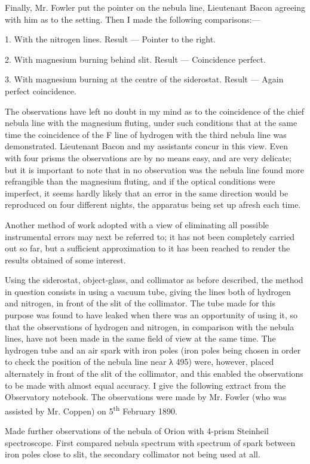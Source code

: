 \documentclass[a4paper, 12pt, oneside, polutonikogreek, english]{article}
\begin{document}
Finally, Mr. Fowler put the pointer on the nebula line, Lieutenant Bacon agreeing with him as to the setting. Then I made the following comparisons:---

1. With the nitrogen lines. Result --- Pointer to the right.

2. With magnesium burning behind slit. Result --- Coincidence perfect.

3. With magnesium burning at the centre of the siderostat. Result --- Again perfect coincidence.

The observations have left no doubt in my mind as to the coincidence of the chief nebula line with the magnesium fluting, under such conditions that at the same time the coincidence of the F line of hydrogen with the third nebula line was demonstrated. Lieutenant Bacon and my assistants concur in this view. Even with four prisms the observations are by no means easy, and are very delicate; but it is important to note that in no observation was the nebula line found more refrangible than the magnesium fluting, and if the optical conditions were imperfect, it seems hardly likely that an error in the same direction would be reproduced on four different nights, the apparatus being set up afresh each time.

Another method of work adopted with a view of eliminating all possible instrumental errors may next be referred to; it has not been completely carried out so far, but a sufficient approximation to it has been reached to render the results obtained of some interest.

Using the siderostat, object-glass, and collimator as before described, the method in question consists in using a vacuum tube, giving the lines both of hydrogen and nitrogen, in front of the slit of the collimator. The tube made for this purpose was found to have leaked when there was an opportunity of using it, so that the observations of hydrogen and nitrogen, in comparison with the nebula lines, have not been made in the same field of view at the same time. The hydrogen tube and an air spark with iron poles (iron poles being chosen in order to check the position of the nebula line near λ 495) were, however, placed alternately in front of the slit of the collimator, and this enabled the observations to be made with almost equal accuracy. I give the following extract from the Observatory notebook. The observations were made by Mr. Fowler (who was assisted by Mr. Coppen) on 5\textsuperscript{th} February 1890.

Made further observations of the nebula of Orion with 4-prism Steinheil spectroscope. First compared nebula spectrum with spectrum of spark between iron poles close to slit, the secondary collimator not being used at all.
\end{document}
